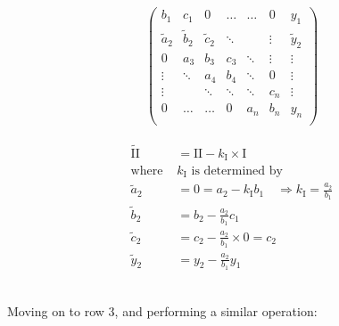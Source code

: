 \documentclass[11pt,a4paper,notitlepage]{article}
\begin{document}
\begin{minipage}{0.5\linewidth}
\begin{align*}
\left(\begin{matrix}
  b_1   & c_1    & 0      & \dots   & \dots  & 0       & y_1     \\
  \tilde{a}_2   & \tilde{b}_2    & \tilde{c}_2    & \ddots  &        & \vdots  & \tilde{y}_2  \\
  0     & a_3    & b_3    & c_3     & \ddots & \vdots  & \vdots  \\
 \vdots & \ddots & a_4    & b_4     & \ddots & 0       & \vdots  \\
 \vdots &        & \ddots & \ddots  & \ddots & c_n     & \vdots  \\
  0     & \dots  & \dots  & 0       & a_{n}  & b_n     & y_{n}   \\
\end{matrix}\right)
\end{align*}
\end{minipage}
\begin{minipage}{0.5\linewidth}
	\begin{align*}
	\tilde{\text{II}} &= \text{II} - k_\text{I} \times \text{I}\\
	\text{where }&k_\text{I} \text{ is determined by}\\
	\tilde{a}_2 &= 0 = a_2 - k_\text{I}b_1 \quad \Rightarrow k_\text{I} = \frac{a_2}{b_1}\\
	\tilde{b}_2 &= b_2 - \frac{a_2}{b_1} c_1 \\
	\tilde{c}_2 &= c_2 - \frac{a_2}{b_1} \times 0 = c_2 \\
	\tilde{y}_2 &= y_2 - \frac{a_2}{b_1} y_1
	\end{align*}
\end{minipage} \\

Moving on to row 3, and performing a similar operation: \\
\end{document}
